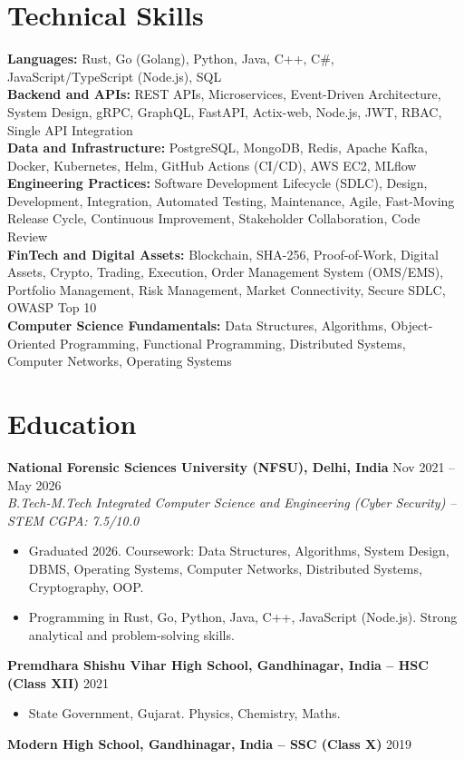 \documentclass[9pt,letterpaper]{article}
\begin{document}
\section{Technical Skills}
\textbf{Languages:} Rust, Go (Golang), Python, Java, C++, C\#, JavaScript/TypeScript (Node.js), SQL \\
\textbf{Backend and APIs:} REST APIs, Microservices, Event-Driven Architecture, System Design, gRPC, GraphQL, FastAPI, Actix-web, Node.js, JWT, RBAC, Single API Integration \\
\textbf{Data and Infrastructure:} PostgreSQL, MongoDB, Redis, Apache Kafka, Docker, Kubernetes, Helm, GitHub Actions (CI/CD), AWS EC2, MLflow \\
\textbf{Engineering Practices:} Software Development Lifecycle (SDLC), Design, Development, Integration, Automated Testing, Maintenance, Agile, Fast-Moving Release Cycle, Continuous Improvement, Stakeholder Collaboration, Code Review \\
\textbf{FinTech and Digital Assets:} Blockchain, SHA-256, Proof-of-Work, Digital Assets, Crypto, Trading, Execution, Order Management System (OMS/EMS), Portfolio Management, Risk Management, Market Connectivity, Secure SDLC, OWASP Top 10 \\
\textbf{Computer Science Fundamentals:} Data Structures, Algorithms, Object-Oriented Programming, Functional Programming, Distributed Systems, Computer Networks, Operating Systems

\section{Education}
\textbf{National Forensic Sciences University (NFSU), Delhi, India} \hfill Nov 2021 -- May 2026\\
\textit{B.Tech-M.Tech Integrated Computer Science and Engineering (Cyber Security) -- STEM} \hfill \textit{CGPA: 7.5/10.0}
\begin{itemize}
\item Graduated 2026. Coursework: Data Structures, Algorithms, System Design, DBMS, Operating Systems, Computer Networks, Distributed Systems, Cryptography, OOP.
\item Programming in Rust, Go, Python, Java, C++, JavaScript (Node.js). Strong analytical and problem-solving skills.
\end{itemize}
\textbf{Premdhara Shishu Vihar High School, Gandhinagar, India -- HSC (Class XII)} \hfill 2021
\begin{itemize}
\item State Government, Gujarat. Physics, Chemistry, Maths.
\end{itemize}
\textbf{Modern High School, Gandhinagar, India -- SSC (Class X)} \hfill 2019
\end{document}
